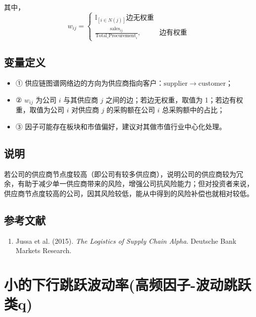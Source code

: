 \documentclass{article}
\begin{document}
其中，
\begin{equation}
    w_{ij} = 
    \begin{cases}
        \mathbb{I}_{[i \in N(j)]} \text{边无权重}\\
        \frac{\mathrm{sales}_{ij}}{\mathrm{Total\_Procurement}_i}, & \text{边有权重}
    \end{cases}
\end{equation}

\subsection{变量定义}
\begin{itemize}
    \item ① 供应链图谱网络边的方向为供应商指向客户：\(\mathrm{supplier} \rightarrow \mathrm{customer}\)；
    \item ② \( w_{ij} \) 为公司 \( i \) 与其供应商 \( j \) 之间的边；若边无权重，取值为 1；若边有权重，取值为公司 \( i \) 对供应商 \( j \) 的采购额在公司 \( i \) 总采购额中的占比；
    \item ③ 因子可能存在板块和市值偏好，建议对其做市值行业中心化处理。
\end{itemize}

\subsection{说明}
若公司的供应商节点度较高（即公司有较多供应商），说明公司的供应商较为冗余，有助于减少单一供应商带来的风险，增强公司抗风险能力；但对投资者来说，供应商节点度较高的公司，因其风险较低，能从中得到的风险补偿也就相对较低。

\subsection{参考文献}
\begin{enumerate}
    \item Jussa et al. (2015). \textit{The Logistics of Supply Chain Alpha}. Deutsche Bank Markets Research.
\end{enumerate}

\section{小的下行跳跃波动率(高频因子-波动跳跃类q)}
\end{document}
